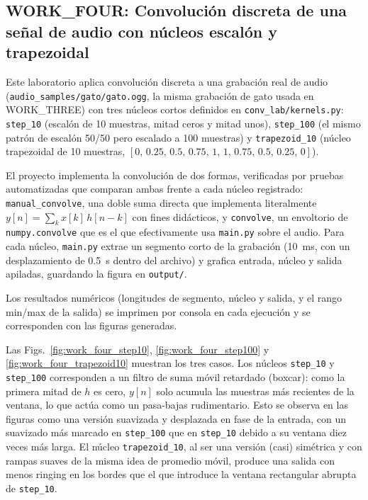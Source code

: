 
\subsection{WORK\_FOUR: Convolución discreta de una señal de audio con núcleos escalón y trapezoidal}

Este laboratorio aplica convolución discreta a una grabación real de audio (\texttt{audio\_samples/gato/gato.ogg}, la misma grabación de gato usada en WORK\_THREE) con tres núcleos cortos definidos en \texttt{conv\_lab/kernels.py}: \texttt{step\_10} (escalón de 10 muestras, mitad ceros y mitad unos), \texttt{step\_100} (el mismo patrón de escalón 50/50 pero escalado a 100 muestras) y \texttt{trapezoid\_10} (núcleo trapezoidal de 10 muestras, \([0,\,0.25,\,0.5,\,0.75,\,1,\,1,\,0.75,\,0.5,\,0.25,\,0]\)).

El proyecto implementa la convolución de dos formas, verificadas por pruebas automatizadas que comparan ambas frente a cada núcleo registrado: \texttt{manual\_convolve}, una doble suma directa que implementa literalmente $y[n]=\sum_k x[k]\,h[n-k]$ con fines didácticos, y \texttt{convolve}, un envoltorio de \texttt{numpy.convolve} que es el que efectivamente usa \texttt{main.py} sobre el audio. Para cada núcleo, \texttt{main.py} extrae un segmento corto de la grabación (10~ms, con un desplazamiento de 0.5~s dentro del archivo) y grafica entrada, núcleo y salida apiladas, guardando la figura en \texttt{output/}.

Los resultados numéricos (longitudes de segmento, núcleo y salida, y el rango min/max de la salida) se imprimen por consola en cada ejecución y se corresponden con las figuras generadas.

Las Figs.~\ref{fig:work_four_step10}, \ref{fig:work_four_step100} y \ref{fig:work_four_trapezoid10} muestran los tres casos. Los núcleos \texttt{step\_10} y \texttt{step\_100} corresponden a un filtro de suma móvil retardado (boxcar): como la primera mitad de $h$ es cero, $y[n]$ solo acumula las muestras más recientes de la ventana, lo que actúa como un pasa-bajas rudimentario. Esto se observa en las figuras como una versión suavizada y desplazada en fase de la entrada, con un suavizado más marcado en \texttt{step\_100} que en \texttt{step\_10} debido a su ventana diez veces más larga. El núcleo \texttt{trapezoid\_10}, al ser una versión (casi) simétrica y con rampas suaves de la misma idea de promedio móvil, produce una salida con menos ringing en los bordes que el que introduce la ventana rectangular abrupta de \texttt{step\_10}.

